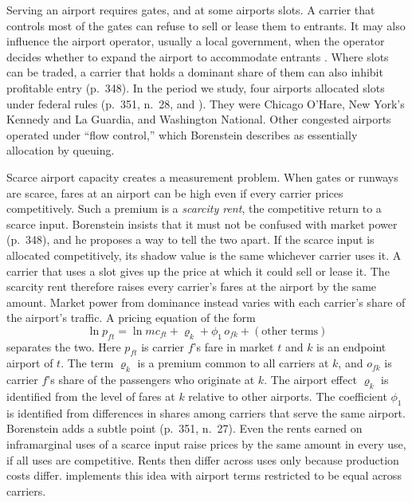 Serving an airport requires gates, and at some airports slots. A carrier that controls most of the gates can
refuse to sell or lease them to entrants. It may also influence the airport operator, usually a local
government, when the operator decides whether to expand the airport to accommodate entrants
\citep[p.~347]{Borenstein1989}. Where slots can be traded, a carrier that holds a dominant share of them can
also inhibit profitable entry (p.~348). In the period we study, four airports allocated slots under federal
rules (p.~351, n.~28, and \citealp[p.~450, n.~9]{WhinstonCollins1992}). They were Chicago O'Hare, New York's
Kennedy and La Guardia, and Washington National. Other congested airports operated under ``flow control,''
which Borenstein describes as essentially allocation by queuing.

Scarce airport capacity creates a measurement problem. When gates or runways are scarce, fares at an airport
can be high even if every carrier prices competitively. Such a premium is a \emph{scarcity rent}, the
competitive return to a scarce input. Borenstein insists that it must not be confused with market power
(p.~348), and he proposes a way to tell the two apart. If the scarce input is allocated competitively, its
shadow value is the same whichever carrier uses it. A carrier that uses a slot gives up the price at which it
could sell or lease it. The scarcity rent therefore raises every carrier's fares at the airport by the same
amount. Market power from dominance instead varies with each carrier's share of the airport's traffic. A
pricing equation of the form
\begin{equation}\label{eq:09-scarcity}
  \ln p_{ft} = \ln mc_{ft} + \varrho_k + \phi_1\, o_{fk} + (\text{other terms})
\end{equation}
separates the two. Here $p_{ft}$ is carrier $f$'s fare in market $t$ and $k$ is an endpoint airport of $t$.
The term $\varrho_k$ is a premium common to all carriers at $k$, and $o_{fk}$ is carrier $f$'s share of the
passengers who originate at $k$. The airport effect $\varrho_k$ is identified from the level of fares at $k$ relative to
other airports. The coefficient $\phi_1$ is identified from differences in shares among carriers that serve the
same airport. Borenstein adds a subtle point (p.~351, n.~27). Even the rents earned on inframarginal uses of a
scarce input raise prices by the same amount in every use, if all uses are competitive. Rents then differ
across uses only because production costs differ.  implements this idea with airport
terms restricted to be equal across carriers.

